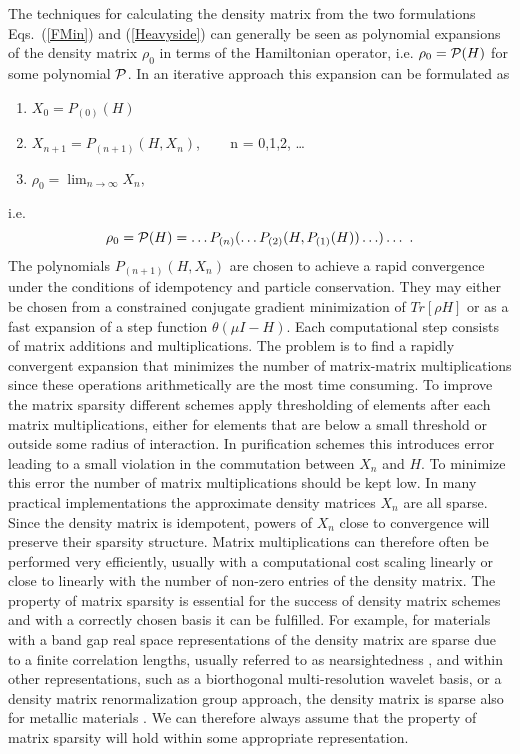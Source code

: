 The techniques for calculating the density matrix
from the two formulations Eqs.\ (\ref{FMin}) and (\ref{Heavyside})
can generally be seen as polynomial expansions of the density matrix $\rho_0$ in terms of 
the Hamiltonian operator, i.e. $\rho_0 = {\cal P}(H)$ for some polynomial ${\cal P}$.
In an iterative approach this expansion can be formulated as
\begin{enumerate}
\item $X_0 = P_{(0)}( H)$
\item $X_{n+1} = P_{(n+1)}( H, X_n)$, ~~~ n = 0,1,2, \ldots
\item $\rho_0 = \lim_{n \rightarrow \infty} X_n,$
\end{enumerate}
i.e. 
\begin{equation} \label{PolD}
\rho_0 = {\cal P}( H) = 
\ldots P_{(n)}(\ldots P_{(2)}(H,P_{(1)}(H)) \ldots )\ldots~.
\end{equation}
The polynomials $P_{(n+1)}( H, X_n)$ are chosen
to achieve a rapid convergence under the conditions of idempotency
and particle conservation. They may either be chosen from
a constrained conjugate gradient minimization of $Tr [\rho H ]$
or as a fast expansion of a step function $\theta(\mu I - H)$. 
Each computational step consists of 
matrix additions and multiplications. The problem is to
find a rapidly convergent expansion that minimizes the number of
matrix-matrix multiplications since these operations arithmetically
are the most time consuming. To improve the matrix sparsity different
schemes apply thresholding of elements after each matrix multiplications, 
either for elements that are below a small threshold or 
outside some radius of interaction.
In purification schemes this introduces error leading to a small violation 
in the commutation between $X_n$ and $H$. To minimize this error the number 
of matrix multiplications should be kept low.
In many practical implementations the approximate
density matrices $X_n$ are all sparse. Since the density matrix is idempotent,
powers of $X_n$ close to convergence will preserve their sparsity structure.
Matrix multiplications can therefore often be performed very efficiently, usually
with a computational cost scaling linearly or close to linearly with the number of
non-zero entries of the density matrix. The property of matrix sparsity is essential
for the success of density matrix schemes and with a correctly chosen basis it can be fulfilled.
For example, for materials with a band gap real space
representations of the density matrix are sparse \cite{Kohn59,Baer97,Stephan00}
due to a finite correlation lengths, usually referred to as nearsightedness \cite{Kohn96},
and within other representations, such as a biorthogonal multi-resolution
wavelet basis, or a density matrix renormalization group approach, the density 
matrix is sparse also for metallic materials \cite{Niklasson02,Beylkin91,Goedecker99,White92}. 
We can therefore always assume that the property of matrix sparsity 
will hold within some appropriate representation. 

